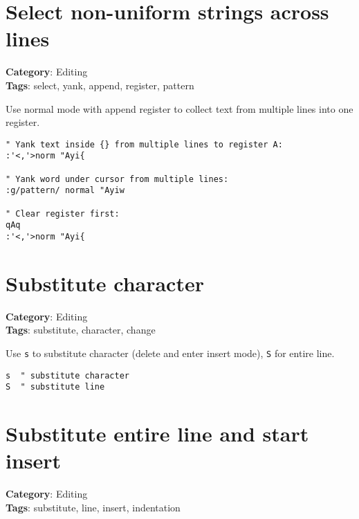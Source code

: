 {{{{\section{Select non-uniform strings across lines}

\textbf{Category}: Editing\\ \textbf{Tags}: select, yank, append, register, pattern
\vspace{0.5cm}

Use normal mode with append register to collect text from multiple lines into one register.

\begin{Exa*}{}
\begin{Verbatim}[fontsize=\footnotesize, breaklines, breakanywhere]
" Yank text inside {} from multiple lines to register A:
:'<,'>norm "Ayi{

" Yank word under cursor from multiple lines:
:g/pattern/ normal "Ayiw

" Clear register first:
qAq
:'<,'>norm "Ayi{
\end{Verbatim}
\end{Exa*}

\section{Substitute character}

\textbf{Category}: Editing\\ \textbf{Tags}: substitute, character, change
\vspace{0.5cm}

Use {\footnotesize \Verb§s§} to substitute character (delete and enter insert mode), {\footnotesize \Verb§S§} for entire line.

\begin{Exa*}{}
\begin{Verbatim}[fontsize=\footnotesize, breaklines, breakanywhere]
s  " substitute character
S  " substitute line
\end{Verbatim}
\end{Exa*}

\section{Substitute entire line and start insert}

\textbf{Category}: Editing\\ \textbf{Tags}: substitute, line, insert, indentation
\vspace{0.5cm}

}}}}
